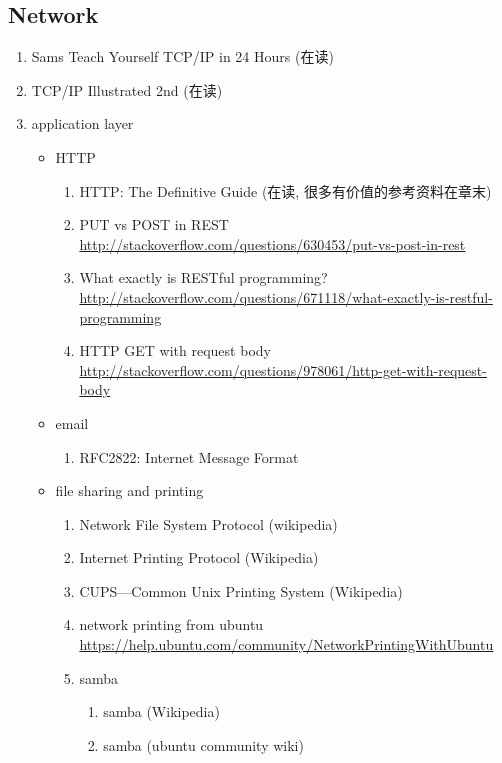 \documentclass{article}
\begin{document}
\subsection{Network}
\begin{enumerate}
    \item Sams Teach Yourself TCP/IP in 24 Hours (在读)
    \item TCP/IP Illustrated 2nd (在读)
    \item application layer
        \begin{itemize}
            \item HTTP
                \begin{enumerate}
                    \item HTTP: The Definitive Guide (在读, 很多有价值的参考资料在章末)
                    \item PUT vs POST in REST \url{http://stackoverflow.com/questions/630453/put-vs-post-in-rest}
                    \item What exactly is RESTful programming? \url{http://stackoverflow.com/questions/671118/what-exactly-is-restful-programming}
                    \item HTTP GET with request body \url{http://stackoverflow.com/questions/978061/http-get-with-request-body}
                \end{enumerate}
            \item email
                \begin{enumerate}
                    \item RFC2822: Internet Message Format
                \end{enumerate}
            \item file sharing and printing
                \begin{enumerate}
                    \item Network File System Protocol (wikipedia)
                    \item Internet Printing Protocol (Wikipedia)
                    \item CUPS---Common Unix Printing System (Wikipedia)
                    \item network printing from ubuntu \url{https://help.ubuntu.com/community/NetworkPrintingWithUbuntu}
                    \item samba
                        \begin{enumerate}
                            \item samba (Wikipedia)
                            \item samba (ubuntu community wiki)

\end{enumerate}
\end{enumerate}
\end{itemize}
\end{enumerate}
\end{document}
